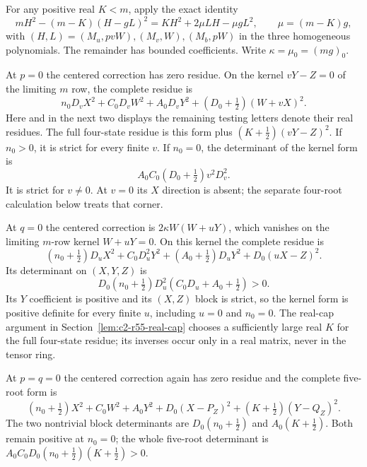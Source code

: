 For any positive real $K<m$, apply the exact identity
\begin{equation}\label{eq:c2-r65-centered}
 mH^2-(m-K)(H-gL)^2
   =KH^2+2\mu LH-\mu gL^2,\qquad \mu=(m-K)g,
\end{equation}
with $(H,L)=(M_u,pvW),(M_v,W),(M_b,pW)$ in the three
homogeneous polynomials. The remainder has bounded coefficients.
Write $\kappa=\mu_0=(mg)_0$.

At $p=0$ the centered correction has zero residue. On the kernel
$vY-Z=0$ of the limiting $m$ row, the complete residue is
\begin{equation}
 n_0D_vX^2+C_0D_vW^2+A_0D_vY^2
       +(D_0+\tfrac12)(W+vX)^2.\tag{R6.5}
\end{equation}
Here and in the next two displays the remaining testing letters denote
their real residues. The full four-state residue is this form plus
$(K+\tfrac12)(vY-Z)^2$. If $n_0>0$, it is strict for every finite
$v$. If $n_0=0$, the determinant of the kernel form is
\[
 A_0C_0(D_0+\tfrac12)v^2D_v^2.
\]
It is strict for $v\ne0$. At $v=0$ its $X$ direction is absent;
the separate four-root calculation below treats that corner.

At $q=0$ the centered correction is
$2\kappa W(W+uY)$, which vanishes on the limiting $m$-row kernel
$W+uY=0$. On this kernel the complete residue is
\begin{equation}
 (n_0+\tfrac12)D_uX^2+C_0D_u^2Y^2
       +(A_0+\tfrac12)D_uY^2+D_0(uX-Z)^2.\tag{R6.6}
\end{equation}
Its determinant on $(X,Y,Z)$ is
\[
 D_0(n_0+\tfrac12)D_u^2(C_0D_u+A_0+\tfrac12)>0.
\]
Its $Y$ coefficient is positive and its $(X,Z)$ block is strict, so
the kernel form is positive definite for every finite $u$, including
$u=0$ and $n_0=0$. The real-cap argument in
Section~\ref{lem:c2-r55-real-cap} chooses a sufficiently large real
$K$ for the full four-state residue; its inverses occur only in a
real matrix, never in the tensor ring.

At $p=q=0$ the centered correction again has zero residue and the
complete five-root form is
\begin{equation}
 (n_0+\tfrac12)X^2+C_0W^2+A_0Y^2+D_0(X-P_Z)^2
                 +(K+\tfrac12)(Y-Q_Z)^2.\tag{R6.7}
\end{equation}
The two nontrivial block determinants are
$D_0(n_0+\tfrac12)$ and $A_0(K+\tfrac12)$. Both remain positive
at $n_0=0$; the whole five-root determinant is
$A_0C_0D_0(n_0+\tfrac12)(K+\tfrac12)>0$.


